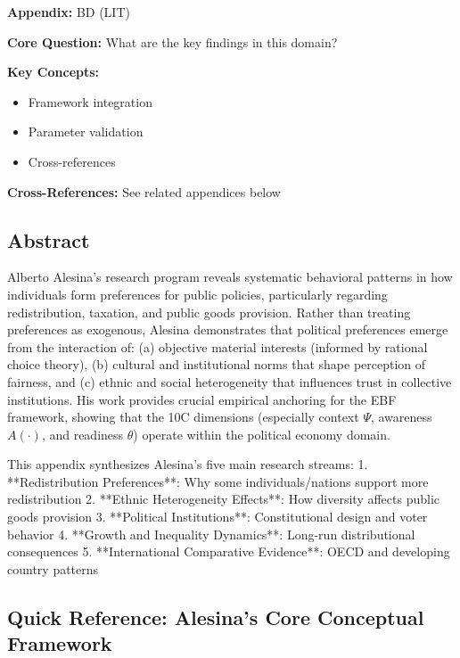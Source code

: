 \begin{tcolorbox}[colback=blue!5!white, colframe=blue!75!black,
    title=Quick Reference: Appendix UNMAPPED_BD]

\textbf{Appendix:} BD (LIT)

\textbf{Core Question:} What are the key findings in this domain?

\textbf{Key Concepts:}
\begin{itemize}[nosep]
\item Framework integration
\item Parameter validation
\item Cross-references
\end{itemize}

\textbf{Cross-References:} See related appendices below
\end{tcolorbox}

\label{app:lit-alesina}

\subsection*{Abstract}

Alberto Alesina's research program reveals systematic behavioral patterns in how individuals form preferences for public policies, particularly regarding redistribution, taxation, and public goods provision. Rather than treating preferences as exogenous, Alesina demonstrates that political preferences emerge from the interaction of: (a) objective material interests (informed by rational choice theory), (b) cultural and institutional norms that shape perception of fairness, and (c) ethnic and social heterogeneity that influences trust in collective institutions. His work provides crucial empirical anchoring for the EBF framework, showing that the 10C dimensions (especially context $\Psi$, awareness $A(\cdot)$, and readiness $\theta$) operate within the political economy domain.

This appendix synthesizes Alesina's five main research streams:
1. **Redistribution Preferences**: Why some individuals/nations support more redistribution
2. **Ethnic Heterogeneity Effects**: How diversity affects public goods provision
3. **Political Institutions**: Constitutional design and voter behavior
4. **Growth and Inequality Dynamics**: Long-run distributional consequences
5. **International Comparative Evidence**: OECD and developing country patterns

\subsection*{Quick Reference: Alesina's Core Conceptual Framework}

